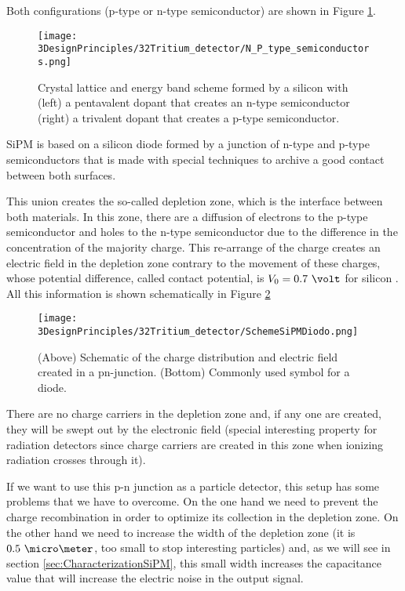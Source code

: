 Both configurations (p-type or n-type semiconductor) are shown in Figure \ref{fig:NPType_SC}.

\begin{figure}[htbp]
\centering
\texttt{[image: 3DesignPrinciples/32Tritium\_detector/N\_P\_type\_semiconductors.png]}
\caption{Crystal lattice and energy band scheme formed by a silicon with (left) a pentavalent dopant that creates an n-type semiconductor (right) a trivalent dopant that creates a p-type semiconductor. \label{fig:NPType_SC}~\cite{Leo}}
\end{figure}

SiPM is based on a silicon diode formed by a junction of n-type and p-type semiconductors that is made with special techniques to archive a good contact between both surfaces.

This union creates the so-called depletion zone, which is the interface between both materials. In this zone, there are a diffusion of electrons to the p-type semiconductor and holes to the n-type semiconductor due to the difference in the concentration of the majority charge. This re-arrange of the charge creates an electric field in the depletion zone contrary to the movement of these charges, whose potential difference, called contact potential, is $V_0 = 0.7~\volt$ for silicon \cite{Leo}. All this information is shown schematically in Figure \ref{fig:DiodeScheme}

\begin{figure}[htbp]
\centering
\texttt{[image: 3DesignPrinciples/32Tritium\_detector/SchemeSiPMDiodo.png]}
\caption{(Above) Schematic of the charge distribution and electric field created in a pn-junction. (Bottom) Commonly used symbol for a diode.\label{fig:DiodeScheme}~\cite{TesisNEXTSiPMs}}
\end{figure}

There are no charge carriers in the depletion zone and, if any one are created, they will be swept out by the electronic field (special interesting property for radiation detectors since charge carriers are created in this zone when ionizing radiation crosses through it).

If we want to use this p-n junction as a particle detector, this setup has some problems that we have to overcome. On the one hand we need to prevent the charge recombination in order to optimize its collection in the depletion zone. On the other hand we need to increase the width of the depletion zone (it is $0.5~\micro\meter$, too small to stop interesting particles) and, as we will see in section \ref{sec:CharacterizationSiPM}, this small width increases the capacitance value that will increase the electric noise in the output signal.

